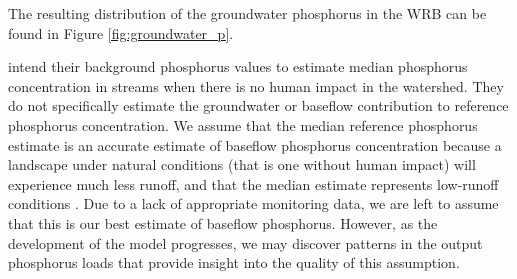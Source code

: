 	The resulting distribution of the groundwater phosphorus in the WRB can be found in Figure \ref{fig:groundwater_p}.
	
	\citet{robertson_wadeable_2006} intend their background phosphorus values to estimate median phosphorus concentration in streams when there is no human impact in the watershed. They do not specifically estimate the groundwater or baseflow contribution to reference phosphorus concentration. We assume that the median reference phosphorus estimate is an accurate estimate of baseflow phosphorus concentration because a landscape under natural conditions (that is one without human impact) will experience much less runoff, and that the median estimate represents low-runoff conditions . Due to a lack of appropriate monitoring data, we are left to assume that this is our best estimate of baseflow phosphorus. However, as the development of the model progresses, we may discover patterns in the output phosphorus loads that provide insight into the quality of this assumption.

